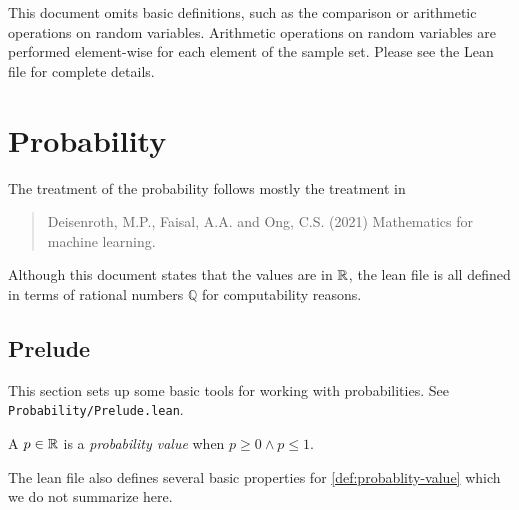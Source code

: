 %

\newcommand{\id}{\operatorname{id}}


\begin{remark}
This document omits basic definitions, such as the comparison or arithmetic operations on random variables. Arithmetic operations on random variables are performed element-wise for each element of the sample set. Please see the Lean file for complete details.
\end{remark}


\section{Probability}

The treatment of the probability follows mostly the treatment in
\begin{quote}
  Deisenroth, M.P., Faisal, A.A. and Ong, C.S. (2021) Mathematics for machine learning.
\end{quote}

Although this document states that the values are in $\mathbb{R}$, the lean file is all defined in terms of rational numbers $\mathbb{Q}$ for computability reasons. 

\subsection{Prelude}

This section sets up some basic tools for working with probabilities. See \texttt{Probability/Prelude.lean}.

\begin{definition} \label{def:probablity-value}
A $p\in \mathbb{R}$ is a \emph{probability value} when $p \ge 0 \wedge p \le 1$.
\leanok
\end{definition}

The lean file also defines several basic properties for \cref{def:probablity-value} which we do not summarize here.

